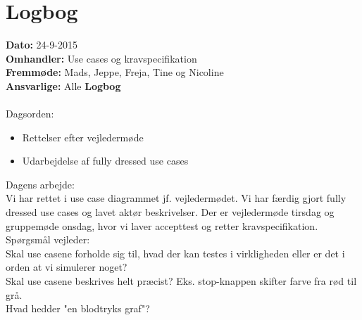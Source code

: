 \section{Logbog}

\textbf{Dato:} 24-9-2015 \\
\textbf{Omhandler:} Use cases og kravspecifikation\\
\textbf{Fremmøde:} Mads, Jeppe, Freja, Tine og Nicoline\\
\textbf{Ansvarlige:} Alle
\textbf{Logbog}
\\
\\
Dagsorden:
\begin{itemize}
	\item Rettelser efter vejledermøde
	\item Udarbejdelse af fully dressed use cases
\end{itemize}

Dagens arbejde: \\
Vi har rettet i use case diagrammet jf. vejledermødet. 
Vi har færdig gjort fully dressed use cases og lavet aktør beskrivelser.
Der er vejledermøde tirsdag og gruppemøde onsdag, hvor vi laver accepttest og retter kravspecifikation.\\


Spørgsmål vejleder: \\
Skal use casene forholde sig til, hvad der kan testes i virkligheden eller er det i orden at vi simulerer noget?\\
Skal use casene beskrives helt præcist? Eks. stop-knappen skifter farve fra rød til grå.\\
Hvad hedder "en blodtryks graf"?\\
